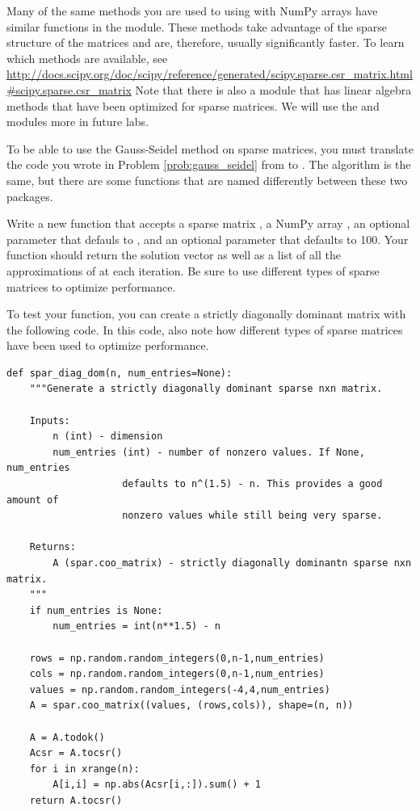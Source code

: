 Many of the same methods you are used to using with NumPy arrays have similar
functions in the  module. These methods take advantage of the
sparse structure of the matrices and are, therefore, usually significantly faster.
To learn which methods are available, see
\url{http://docs.scipy.org/doc/scipy/reference/generated/scipy.sparse.csr_matrix.html#scipy.sparse.csr_matrix}
Note that there is also a  module that has linear algebra
methods that have been optimized for sparse matrices. We will use the
 and  modules more in future labs.

\begin{problem}
To be able to use the Gauss-Seidel method on sparse matrices, you must translate
the code you wrote in Problem \ref{prob:gauss_seidel} from  to .
The algorithm is the same, but there are some functions that are named differently
between these two packages.

Write a new function that accepts a sparse matrix , a NumPy array ,
an optional parameter  that defauls to , and an optional parameter
 that defaults to 100. Your function should return the solution
vector  as well as a list of all the approximations of  at each
iteration. Be sure to use different types of sparse matrices to optimize
performance.

To test your function, you can create a strictly diagonally dominant matrix with
the following code. In this code, also note how different types of sparse matrices
have been used to optimize performance.
\begin{lstlisting}
def spar_diag_dom(n, num_entries=None):
    """Generate a strictly diagonally dominant sparse nxn matrix.

    Inputs:
        n (int) - dimension
        num_entries (int) - number of nonzero values. If None, num_entries
                    defaults to n^(1.5) - n. This provides a good amount of
                    nonzero values while still being very sparse.

    Returns:
        A (spar.coo_matrix) - strictly diagonally dominantn sparse nxn matrix.
    """
    if num_entries is None:
        num_entries = int(n**1.5) - n

    rows = np.random.random_integers(0,n-1,num_entries)
    cols = np.random.random_integers(0,n-1,num_entries)
    values = np.random.random_integers(-4,4,num_entries)
    A = spar.coo_matrix((values, (rows,cols)), shape=(n, n))

    A = A.todok()
    Acsr = A.tocsr()
    for i in xrange(n):
        A[i,i] = np.abs(Acsr[i,:]).sum() + 1
    return A.tocsr()
\end{lstlisting}

\end{problem}


